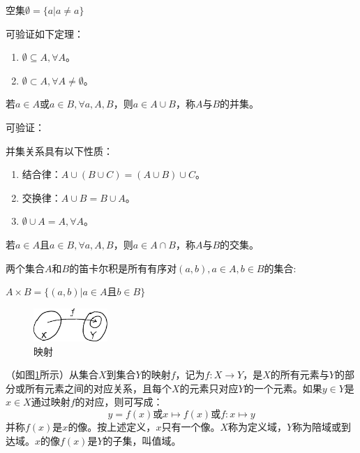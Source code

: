 \documentclass[main.tex]{subfiles}
\begin{document}
\begin{definition}
空集$\emptyset = \{a|a\neq a\}$
\end{definition}

可验证如下定理：

\begin{theorem}
\begin{enumerate}
    \item $\emptyset\subseteq A,\forall A$。
    \item $\emptyset\subset A,\forall A\neq\emptyset$。
\end{enumerate}
\end{theorem}

\begin{definition}[并集]
若$a\in A$或$a\in B,\forall a,A,B$，则$a\in A\cup B$，称$A$与$B$的并集。
\end{definition}

可验证：
\begin{theorem}
并集关系具有以下性质：
\begin{enumerate}
    \item 结合律：$A\cup\left(B\cup C\right)=\left(A\cup B\right)\cup C$。
    \item 交换律：$A\cup B=B\cup A$。
    \item $\emptyset\cup A=A,\forall A$。
\end{enumerate}
\end{theorem}

\begin{definition}[交集]
若$a\in A$且$a\in B,\forall a,A,B$，则$a\in A\cap B$，称$A$与$B$的交集。
\end{definition}

\begin{definition}[笛卡尔积]
两个集合$A$和$B$的笛卡尔积是所有有序对$\left(a,b\right),a\in A,b\in B$的集合:

$A\times B=\{\left(a,b\right)|a\in A\text{且}b\in B\}$
\end{definition}

\begin{figure}[htbp]
\centering
\includegraphics[width=0.25\textwidth]{images/II.1.1.eps}
\caption{映射}
\label{fig:II.1.1}
\end{figure}

\begin{definition}[映射]
（如图\ref{fig:II.1.1}所示）从集合$X$到集合$Y$的映射$f$，记为$f:X\rightarrow Y$，是$X$的所有元素与$Y$的部分或所有元素之间的对应关系，且每个$X$的元素只对应$Y$的一个元素。如果$y\in Y$是$x\in X$通过映射$f$的对应，则可写成：
\[y=f\left(x\right)\text{或}x\mapsto f\left(x\right)\text{或}f:x\mapsto y\]
并称$f\left(x\right)$是$x$的像。按上述定义，$x$只有一个像。$X$称为定义域，$Y$称为陪域或到达域。$x$的像$f\left(x\right)$是$Y$的子集，叫值域。
\end{definition}
\end{document}
